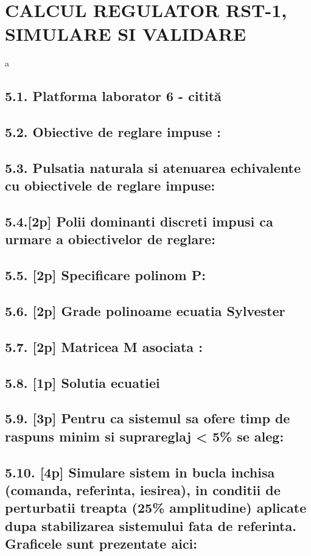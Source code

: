 \documentclass[12pt,english]{article}
\begin{document}
\section { CALCUL REGULATOR RST-1, SIMULARE SI VALIDARE }
a
\subsection {5.1. Platforma laborator 6 - citită }
\subsection {5.2.  Obiective de reglare impuse  : }
\subsection {5.3. Pulsatia naturala si atenuarea echivalente cu obiectivele de reglare impuse: }
\subsection {5.4.[2p] Polii dominanti discreti impusi ca urmare a obiectivelor de reglare: }
\subsection {5.5. [2p] Specificare polinom P: }
\subsection {5.6. [2p] Grade polinoame ecuatia Sylvester }
\subsection {5.7. [2p]  Matricea M asociata : }
\subsection {5.8. [1p] Solutia ecuatiei}
\subsection {5.9. [3p] Pentru ca sistemul sa ofere timp de raspuns minim si suprareglaj < 5\% se aleg: }
\subsection {5.10. [4p]  Simulare sistem in bucla inchisa (comanda, referinta, iesirea), in conditii de perturbatii treapta (25\% amplitudine) aplicate dupa stabilizarea sistemului fata de referinta. Graficele sunt prezentate aici: }
\end{document}
